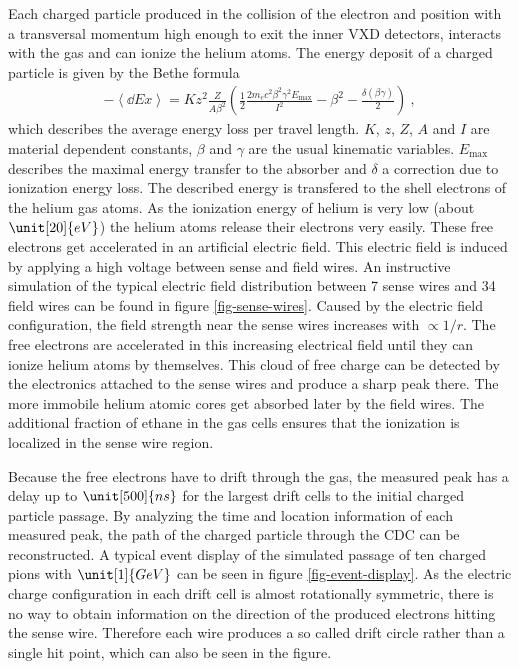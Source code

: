 Each charged particle produced in the collision of the electron and position with a transversal momentum high enough to exit the inner VXD detectors, interacts with the gas and can ionize the helium atoms. The energy deposit of a charged particle is given by the Bethe formula~\cite{bethe}
\begin{align}
 - \left\langle \dd{E}{x} \right\rangle = K z^2 \frac{Z}{A \beta^2} \left( \frac 1 2 \frac{2 m_e c^2 \beta^2 \gamma^2 E_\text{max}}{I^2} - \beta^2 - \frac{\delta(\beta \gamma)}{2}  \right) \ , \label{form-bethe}
\end{align}
which describes the average energy loss per travel length. $K$, $z$, $Z$, $A$ and $I$ are material dependent constants, $\beta$ and $\gamma$ are the usual kinematic variables. $E_\text{max}$ describes the maximal energy transfer to the absorber and $\delta$ a correction due to ionization energy loss. The described energy is transfered to the shell electrons of the helium gas atoms. As the ionization energy of helium is very low (about $\unit[20]{eV}$) the helium atoms release their electrons very easily. These free electrons get accelerated in an artificial electric field. This electric field is induced by applying a high voltage between sense and field wires. An instructive simulation of the typical electric field distribution between 7 sense wires and 34 field wires can be found in figure \ref{fig-sense-wires}. Caused by the electric field configuration, the field strength near the sense wires increases with $\propto 1/r$. The free electrons are accelerated in this increasing  electrical field until they can ionize helium atoms by themselves. This cloud of free charge can be detected by the electronics attached to the sense wires and produce a sharp peak there. The more immobile helium atomic cores get absorbed later by the field wires. The additional fraction of ethane in the gas cells ensures that the ionization is localized in the sense wire region.

Because the free electrons have to drift through the gas, the measured peak has a delay up to $\unit[500]{ns}$ for the largest drift cells to the initial charged particle passage. By analyzing the time and location information of each measured peak, the path of the charged particle through the CDC can be reconstructed. A typical event display of the simulated passage of ten charged pions with $\unit[1]{GeV}$ can be seen in figure \ref{fig-event-display}. As the electric charge configuration in each drift cell is almost rotationally symmetric, there is no way to obtain information on the direction of the produced electrons hitting the sense wire. Therefore each wire produces a so called drift circle rather than a single hit point, which can also be seen in the figure.

